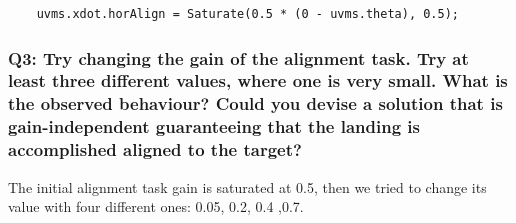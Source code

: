 \documentclass{article}
\begin{document}
\begin{lstlisting}
	uvms.xdot.horAlign = Saturate(0.5 * (0 - uvms.theta), 0.5);
\end{lstlisting}

\subsubsection{Q3: Try changing the gain of the alignment task. Try at least three different values, where one is very small. What is the observed behaviour? Could you devise a solution that is gain-independent guaranteeing that the landing is accomplished aligned to the target?}
The initial alignment task gain is saturated at 0.5, then we tried to change its value with four different ones: 0.05, 0.2, 0.4 ,0.7.

\begin{figure}[H]
	\centering
	\hspace{10mm}
	\label{im:v_land_gain0_05}
\end{figure} 

\begin{figure}[H]
	\centering
	\hspace{10mm}
	\label{im:v_land_gain0_2}
\end{figure} 

\begin{figure}[H]
	\centering
	\hspace{10mm}
	\label{im:v_land_gain0_4}
\end{figure} 
\end{document}
